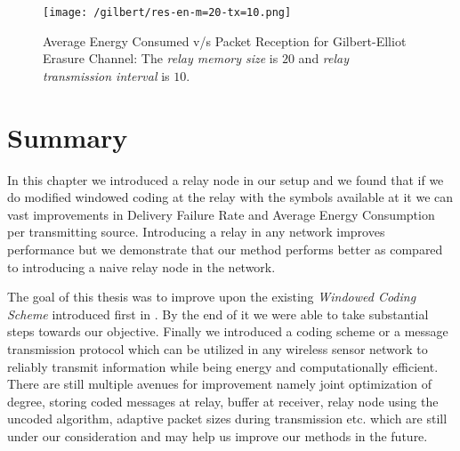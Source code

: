 \begin{figure}[H]
	\centering
	\texttt{[image: /gilbert/res-en-m=20-tx=10.png]}
	\caption{Average Energy Consumed v/s Packet Reception for Gilbert-Elliot Erasure Channel:  The \textit{relay memory size} is $20$ and \textit{relay transmission interval} is $10$.}
	\label{relay-res-5}
\end{figure}

\newpage
\section{Summary}
In this chapter we introduced a relay node in our setup and we found that if we do modified windowed coding at the relay with the symbols available at it we can vast improvements in Delivery Failure Rate and Average Energy Consumption per transmitting source. Introducing a relay in any network improves performance but we demonstrate that our method performs better as compared to introducing a naive relay node in the network.

The goal of this thesis was to improve upon the existing \textit{Windowed Coding Scheme} introduced first in \cite{borkotokyicc}. By the end of it we were able to take substantial steps towards our objective. Finally we introduced a coding scheme or a message transmission protocol which can be utilized in any wireless sensor network to reliably transmit information while being energy and computationally efficient. There are still multiple avenues for improvement namely joint optimization of degree, storing coded messages at relay, buffer at receiver, relay node using the uncoded algorithm, adaptive packet sizes during transmission etc. which are still under our consideration and may help us improve our methods in the future.


